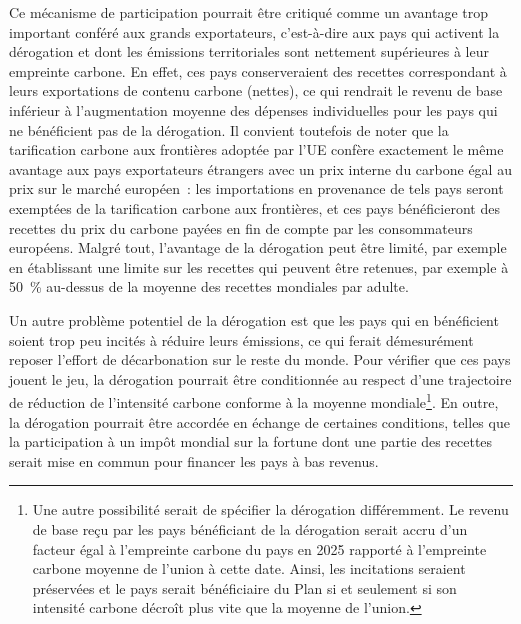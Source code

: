 \documentclass[a5paper,french,openany]{memoir}
\begin{document}
Ce mécanisme de participation pourrait être critiqué comme un avantage trop important conféré aux grands exportateurs, c'est-à-dire aux pays qui activent la dérogation et dont les émissions territoriales sont nettement supérieures à leur empreinte carbone. En effet, ces pays conserveraient des recettes correspondant à leurs exportations de contenu carbone (nettes), ce qui rendrait le revenu de base inférieur à l'augmentation moyenne des dépenses individuelles pour les pays qui ne bénéficient pas de la dérogation. Il convient toutefois de noter que la tarification carbone aux frontières adoptée par l'UE confère exactement le même avantage aux pays exportateurs étrangers avec un prix interne du carbone égal au prix sur le marché européen~: les importations en provenance de tels pays seront exemptées de la tarification carbone aux frontières, et ces pays bénéficieront des recettes du prix du carbone payées en fin de compte par les consommateurs européens. Malgré tout, l'avantage de la dérogation peut être limité, par exemple en établissant une limite sur les recettes qui peuvent être retenues, par exemple à 50~\% au-dessus de la moyenne des recettes mondiales par adulte. %

Un autre problème potentiel de la dérogation est que les pays qui en bénéficient soient trop peu incités à réduire leurs émissions, ce qui ferait démesurément reposer l'effort de décarbonation sur le reste du monde. Pour vérifier que ces pays jouent le jeu, la dérogation pourrait être conditionnée au respect d'une trajectoire de réduction de l'intensité carbone conforme à la moyenne mondiale\footnote{Une autre possibilité serait de spécifier la dérogation différemment. Le revenu de base reçu par les pays bénéficiant de la dérogation serait accru d'un facteur égal à l'empreinte carbone du pays en 2025 rapporté à l'empreinte carbone moyenne de l'union à cette date. Ainsi, les incitations seraient préservées et le pays serait bénéficiaire du Plan si et seulement si son intensité carbone décroît plus vite que la moyenne de l'union.}. 
En outre, la dérogation pourrait être accordée en échange de certaines conditions, telles que la participation à un impôt mondial sur la fortune dont une partie des recettes serait mise en commun pour financer les pays à bas revenus.
\end{document}
